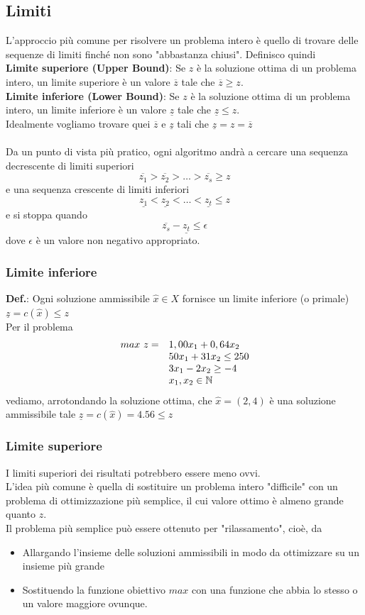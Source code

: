 \documentclass[12pt,a4paper]{article}
\begin{document}
\subsection{Limiti}
L'approccio più comune per risolvere un problema intero è quello di trovare delle sequenze di limiti finché non sono "abbastanza chiusi". Definisco quindi\\
\textbf{Limite superiore (Upper Bound)}: Se $z$ è la soluzione ottima di un problema intero, un limite superiore è un valore $\overline{z}$ tale che $\overline{z} \geq z$.\\
\textbf{Limite inferiore (Lower Bound)}: Se $z$ è la soluzione ottima di un problema intero, un limite inferiore è un valore $\underline{z}$ tale che $\underline{z} \leq z$.\\
Idealmente vogliamo trovare quei $\overline{z}$ e $\underline{z}$ tali che $\underline{z} = z = \overline{z}$\\
\\
Da un punto di vista più pratico, ogni algoritmo andrà a cercare una sequenza decrescente di limiti superiori
$$\overline{z_1} > \overline{z_2} > \dots > \overline{z_s} \geq z$$
e una sequenza crescente di limiti inferiori
$$\underline{z_1} < \underline{z_2} < \dots < \underline{z_t} \leq z$$
e si stoppa quando $$\overline{z_s} - \underline{z_t} \leq \epsilon$$
dove $\epsilon$ è un valore non negativo appropriato.

\subsubsection{Limite inferiore}
\textbf{Def.}: Ogni soluzione ammissibile $\hat x \in X$ fornisce un limite inferiore (o primale) $\underline{z}=c(\hat x) \leq z$\\
Per il problema $$\begin{array}{rl}
max \ z = & 1,00 x_1 + 0,64 x_2\\
& 50 x_1 + 31 x_2 \leq 250\\
& 3 x_1 - 2x_2 \geq -4\\
& x_1,x_2  \in \mathbb{N}
\end{array}$$
vediamo, arrotondando la soluzione ottima, che $\hat x =(2,4)$ è una soluzione ammissibile tale $\underline{z}=c(\hat x)=4.56 \leq z$

\subsubsection{Limite superiore}
I limiti superiori dei risultati potrebbero essere meno ovvi.\\
L'idea più comune è quella di sostituire un problema intero "difficile" con un problema di ottimizzazione più semplice, il cui valore ottimo è almeno grande quanto $z$.\\
Il problema più semplice può essere ottenuto per "rilassamento", cioè, da
\begin{itemize}
\item Allargando l'insieme delle soluzioni ammissibili in modo da ottimizzare su un insieme più grande
\item Sostituendo la funzione obiettivo $max$ con una funzione che abbia lo stesso o un valore maggiore ovunque.
\end{itemize}
\end{document}
